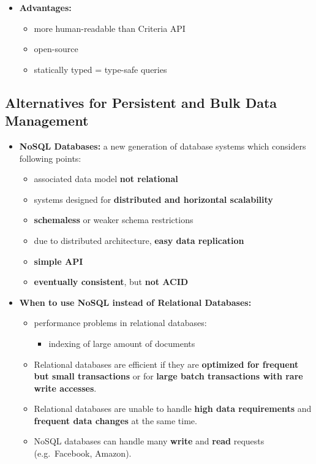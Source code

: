 \documentclass[ieeetran]{article}
\begin{document}
\begin{itemize}
\begin{itemize}
	\item \textbf{Advantages:}
		\begin{itemize}
		  \item more human-readable than Criteria API
		\item open-source
			\item statically typed = type-safe queries
		\end{itemize}
	\end{itemize}


\end{itemize}


\subsection{Alternatives for Persistent and Bulk Data Management} %
\label{sub:alternatives_for_persistent_and_bulk_data_management}

\begin{itemize}
  \item \textbf{NoSQL Databases:} a new generation of database systems which considers following points:
	  \begin{itemize}
	    \item associated data model \textbf{not relational}
	\item systems designed for \textbf{distributed and horizontal scalability}
	\item \textbf{schemaless} or weaker schema restrictions 
	\item due to distributed architecture, \textbf{easy data replication}
	\item \textbf{simple API}
	\item \textbf{eventually consistent}, but \textbf{not ACID}
	  \end{itemize}

\item \textbf{When to use NoSQL instead of Relational Databases:}
	\begin{itemize}
	  \item performance problems in relational databases:
		  \begin{itemize}
		    \item indexing of large amount of documents
		  \end{itemize}

	\item Relational databases are efficient if they are \textbf{optimized for frequent but small transactions} or for \textbf{large batch transactions with rare write accesses}.
	\item Relational databases are unable to handle \textbf{high data requirements} and \textbf{frequent data changes} at the same time.

	\item NoSQL databases can handle many \textbf{write} and \textbf{read} requests (e.g.\ Facebook, Amazon).
	\end{itemize}
\end{itemize}
\end{document}
